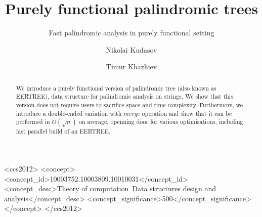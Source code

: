 \documentclass[sigconf]{acmart}
\begin{document}
\title{Purely functional palindromic trees}
\subtitle{Fast palindromic analysis in purely functional setting}


\author{Nikolai Kudasov}

\author{Timur Khazhiev}

\begin{abstract}
  We introduce a purely functional version of
  palindromic tree (also known as EERTREE), data structure
  for palindromic analysis on strings. We show that
  this version does not require users to sacrifice
  space and time complexity. Furthermore, we introduce
  a double-ended variation with $merge$ operation and
  show that it can be performed in $O(\sqrt{n})$
  on average, openning door for various optimisations,
  including fast parallel build of an EERTREE.
\end{abstract}

%
%
\begin{CCSXML}
<ccs2012>
<concept>
<concept_id>10003752.10003809.10010031</concept_id>
<concept_desc>Theory of computation~Data structures design and analysis</concept_desc>
<concept_significance>500</concept_significance>
</concept>
</ccs2012>
\end{CCSXML}



\maketitle





\end{document}
